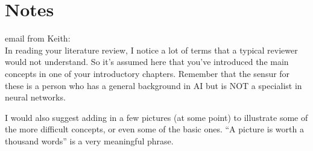 \section{Notes}
email from Keith:
\\
  In reading your literature review, I notice a lot of terms that a typical reviewer would not understand.  So it’s assumed here that you’ve introduced the main concepts in one of your introductory chapters.  Remember that the
sensur for these is a person who has a general background in AI but is  NOT a specialist in neural networks.

  I would also suggest adding in a few pictures (at some point) to illustrate some of the more difficult concepts, or even some of the basic ones.  “A picture is worth a thousand words” is a very meaningful phrase.

\cleardoublepage